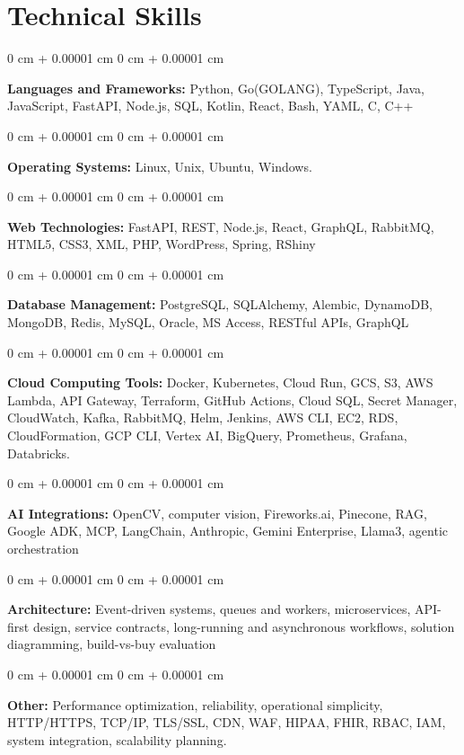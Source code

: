 \documentclass[10pt, letterpaper]{article}
\newenvironment{onecolentry}{
    \begin{adjustwidth}{
        0 cm + 0.00001 cm
    }{
        0 cm + 0.00001 cm
    }
}{
    \end{adjustwidth}
} %
\begin{document}
    \vspace{2 pt }

    \section{Technical Skills}
    \vspace{2 pt }
    \begin{onecolentry}
    \textbf{Languages and Frameworks:} Python, Go(GOLANG), TypeScript, Java, JavaScript, FastAPI, Node.js, SQL, Kotlin, React, Bash, YAML, C, C++
    \end{onecolentry}
    \begin{onecolentry}
        \textbf{Operating Systems:} Linux, Unix, Ubuntu, Windows.
    \end{onecolentry}
    \begin{onecolentry}
         \textbf{Web Technologies:} FastAPI, REST, Node.js, React, GraphQL, RabbitMQ, HTML5, CSS3, XML, PHP, WordPress, Spring, RShiny
    \end{onecolentry}
    \begin{onecolentry}
        \textbf{Database Management:} PostgreSQL, SQLAlchemy, Alembic, DynamoDB, MongoDB, Redis, MySQL, Oracle, MS Access, RESTful APIs, GraphQL
    \end{onecolentry}
    \begin{onecolentry}
        \textbf{Cloud Computing Tools:}
Docker, Kubernetes, Cloud Run, GCS, S3, AWS Lambda, API Gateway, Terraform, GitHub Actions, Cloud SQL, Secret Manager, CloudWatch, Kafka, RabbitMQ, Helm, Jenkins, AWS CLI, EC2, RDS, CloudFormation, GCP CLI, Vertex AI, BigQuery, Prometheus, Grafana, Databricks.
    \end{onecolentry}
    \begin{onecolentry}
         \textbf{AI Integrations:} OpenCV, computer vision, Fireworks.ai, Pinecone, RAG, Google ADK, MCP, LangChain, Anthropic, Gemini Enterprise, Llama3, agentic orchestration
    \end{onecolentry}
    \begin{onecolentry}
        \textbf{Architecture:} Event-driven systems, queues and workers, microservices, API-first design, service contracts, long-running and asynchronous workflows, solution diagramming, build-vs-buy evaluation
    \end{onecolentry}
        \begin{onecolentry}
     \textbf{Other:} Performance optimization, reliability, operational simplicity, HTTP/HTTPS, TCP/IP, TLS/SSL, CDN, WAF, HIPAA, FHIR, RBAC, IAM, system integration, scalability planning.
    \end{onecolentry}
\end{document}
